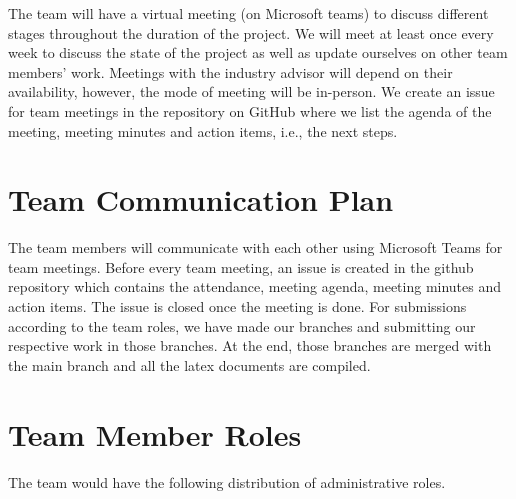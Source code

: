 \documentclass{article}
\begin{document}
The team will have a virtual meeting (on Microsoft teams) to discuss different stages throughout the duration of the project. We will meet at least once every week to discuss the state of the project as well as update ourselves on other team members’ work. Meetings with the industry advisor will depend on their availability, however, the mode of meeting will be in-person. We create an issue for team meetings in the repository on GitHub where we list the agenda of the meeting, meeting minutes and action items, i.e., the next steps.

\section{Team Communication Plan}


The team members will communicate with each other using Microsoft Teams for team meetings. Before every team meeting, an issue is created in the github repository which contains the attendance, meeting agenda, meeting minutes and action items. The issue is closed once the meeting is done. 
For submissions according to the team roles, we have made our branches and submitting our respective work in those branches. At the end, those branches are merged with the main branch and all the latex documents are compiled. 

\section{Team Member Roles}
 
The team would have the following distribution of administrative roles.
\end{document}
